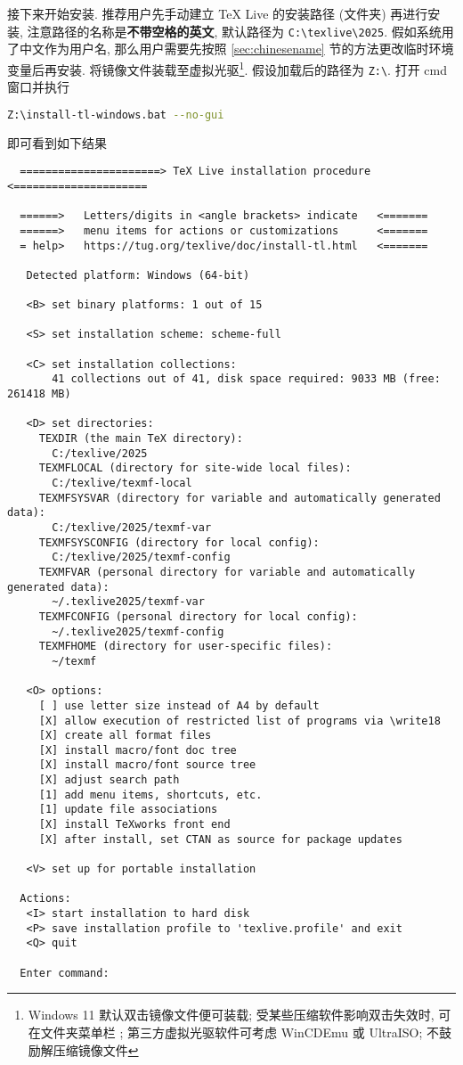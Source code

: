 接下来开始安装.
推荐用户先手动建立 \TeX{} Live 的安装路径 (文件夹) 再进行安装,
注意路径的名称是\textbf{不带空格的英文},
默认路径为 \texttt{C:\textbackslash texlive\textbackslash 2025}.
假如系统用了中文作为用户名,
那么用户需要先按照 \ref{sec:chinesename} 节的方法更改临时环境变量后再安装.
将镜像文件装载至虚拟光驱\footnote{Windows 11 默认双击镜像文件便可装载;
受某些压缩软件影响双击失效时,
可在文件夹菜单栏
;
第三方虚拟光驱软件可考虑 WinCDEmu 或 UltraISO;
不鼓励解压缩镜像文件}. 
假设加载后的路径为 \texttt{Z:\textbackslash}.
打开 \textsf{cmd} 窗口并执行
\begin{lstlisting}[language = bash]
  Z:\install-tl-windows.bat --no-gui
\end{lstlisting}
即可看到如下结果
\begin{lstlisting}
  ======================> TeX Live installation procedure <=====================

  ======>   Letters/digits in <angle brackets> indicate   <=======
  ======>   menu items for actions or customizations      <=======
  = help>   https://tug.org/texlive/doc/install-tl.html   <=======

   Detected platform: Windows (64-bit)

   <B> set binary platforms: 1 out of 15

   <S> set installation scheme: scheme-full

   <C> set installation collections:
       41 collections out of 41, disk space required: 9033 MB (free: 261418 MB)

   <D> set directories:
     TEXDIR (the main TeX directory):
       C:/texlive/2025
     TEXMFLOCAL (directory for site-wide local files):
       C:/texlive/texmf-local
     TEXMFSYSVAR (directory for variable and automatically generated data):
       C:/texlive/2025/texmf-var
     TEXMFSYSCONFIG (directory for local config):
       C:/texlive/2025/texmf-config
     TEXMFVAR (personal directory for variable and automatically generated data):
       ~/.texlive2025/texmf-var
     TEXMFCONFIG (personal directory for local config):
       ~/.texlive2025/texmf-config
     TEXMFHOME (directory for user-specific files):
       ~/texmf

   <O> options:
     [ ] use letter size instead of A4 by default
     [X] allow execution of restricted list of programs via \write18
     [X] create all format files
     [X] install macro/font doc tree
     [X] install macro/font source tree
     [X] adjust search path
     [1] add menu items, shortcuts, etc.
     [1] update file associations
     [X] install TeXworks front end
     [X] after install, set CTAN as source for package updates

   <V> set up for portable installation

  Actions:
   <I> start installation to hard disk
   <P> save installation profile to 'texlive.profile' and exit
   <Q> quit

  Enter command:
\end{lstlisting}
